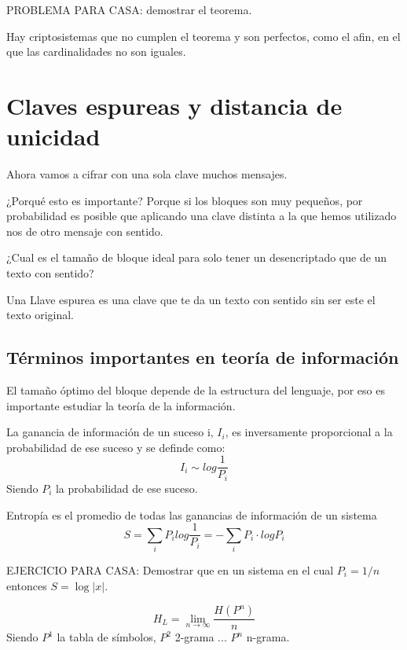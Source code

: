  PROBLEMA PARA CASA: demostrar el teorema.
 
 Hay criptosistemas que no cumplen el teorema y son perfectos, como el afin, en el que las cardinalidades no son iguales.
 
 \section{Claves espureas y distancia de unicidad}
 
 Ahora vamos a cifrar con una sola clave muchos mensajes.
 
  ¿Porqué esto es importante? Porque si los bloques son muy pequeños, por probabilidad es posible que aplicando una clave distinta a la que hemos utilizado nos de otro mensaje con sentido.
 
 ¿Cual es el tamaño de bloque ideal para solo tener un desencriptado que de un texto con sentido?
 
 Una Llave espurea es una clave que te da un texto con sentido sin ser este el texto original.
 
 \subsection{Términos importantes en teoría de información}
 
 El tamaño óptimo del bloque depende de la estructura del lenguaje, por eso es importante estudiar la teoría de la información.
 
 
 \begin{defn}
 La ganancia de información  de un suceso i, $I_i$, es inversamente proporcional a la probabilidad de ese suceso y se definde como:
 $$I_i \sim log\frac{1}{P_i}$$
 Siendo $P_i$ la probabilidad de ese suceso.
\end{defn}


\begin{defn}[Entropía]
Entropía es el promedio de todas las ganancias de información de un sistema
$$S= \sum_{i} P_i log \frac{1}{P_i} = - \sum_{i}P_i\cdot log P_i$$
\end{defn}


EJERCICIO PARA CASA: Demostrar que en un sistema en el cual $P_i = 1/n$ entonces $S = \log |x|$.

\begin{defn}

$$H_L = \lim\limits_{n\rightarrow \infty} \frac{H(P^n)}{n}$$
Siendo $P^1$ la tabla de símbolos, $P^2$ 2-grama ... $P^n$ n-grama.
\end{defn}


